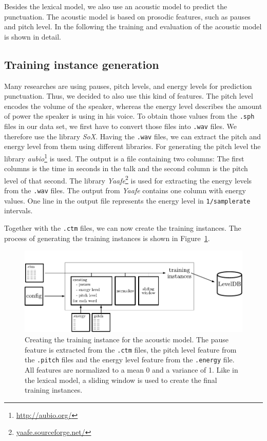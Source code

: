 Besides the lexical model, we also use an acoustic model to predict the punctuation.
The acoustic model is based on prosodic features, such as pauses and pitch level.
In the following the training and evaluation of the acoustic model is shown in detail.

\subsection{Training instance generation}

Many researches are using pauses, pitch levels, and energy levels for prediction punctuation.
Thus, we decided to also use this kind of features.
The pitch level encodes the volume of the speaker, whereas the energy level describes the amount of power the speaker is using in his voice.
To obtain those values from the \texttt{.sph} files in our data set, we first have to convert those files into \texttt{.wav} files.
We therefore use the library \emph{SoX}.
Having the \texttt{.wav} files, we can extract the pitch and energy level from them using different libraries.
For generating the pitch level the library \emph{aubio}\footnote{\url{http://aubio.org/}} is used.
The output is a file containing two columns: The first columns is the time in seconds in the talk and the second column is the pitch level of that second.
The library \emph{Yaafe}\footnote{\url{yaafe.sourceforge.net/}} is used for extracting the energy levels from the \texttt{.wav} files.
The output from \emph{Yaafe} contains one column with energy values.
One line in the output file represents the energy level in \texttt{1/samplerate} intervals.

Together with the \texttt{.ctm} files, we can now create the training instances.
The process of generating the training instances is shown in Figure~\ref{fig:overview_acoustic}.

\begin{figure}[ht]
    \centering
    \includegraphics[width=\textwidth]{img/overview_accoustic.pdf}
    \caption{Creating the training instance for the acoustic model. The pause feature is extracted from the \texttt{.ctm} files, the pitch level feature from the \texttt{.pitch} files and the energy level feature from the \texttt{.energy} file. All features are normalized to a mean 0 and a variance of 1. Like in the lexical model, a sliding window is used to create the final training instances.}
    \label{fig:overview_acoustic}
\end{figure}

